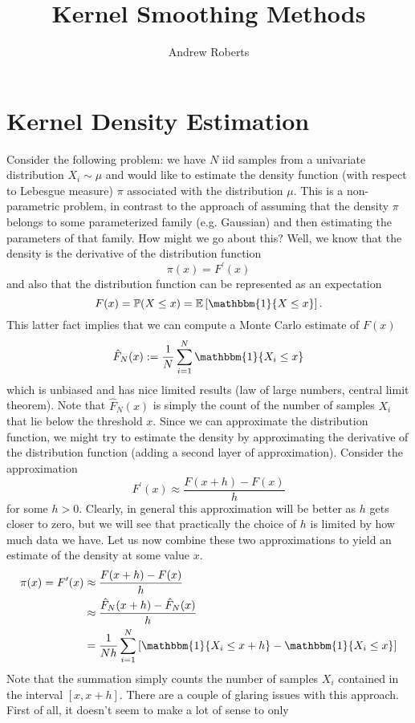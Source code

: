 \documentclass[12pt]{article}
\title{Kernel Smoothing Methods}
\author{Andrew Roberts}
\newcommand{\E}{\mathbb{E}}
\newcommand{\Prob}{\mathbb{P}}
\begin{document}
\maketitle
\tableofcontents
\newpage

\section{Kernel Density Estimation}
Consider the following problem: we have $N$ iid samples from a univariate distribution $X_i \sim \mu$ and would like to estimate the density function (with respect to Lebesgue measure) $\pi$ associated 
with the distribution $\mu$. This is a non-parametric problem, in contrast to the approach of assuming that the density $\pi$ belongs to some parameterized family (e.g. Gaussian) and then 
estimating the parameters of that family. How might we go about this? Well, we know that the density is the derivative of the distribution function
\[\pi(x) = F^\prime(x)\]
and also that the distribution function can be represented as an expectation 
\[F(x) = \Prob(X \leq x) = \E \left[\mathbbm{1}\{X \leq x\}\right].\]
This latter fact implies that we can compute a Monte Carlo estimate of $F(x)$
\[\hat{F}_N(x) := \frac{1}{N} \sum_{i = 1}^{N} \mathbbm{1}\{X_i \leq x\}\]
which is unbiased and has nice limited results (law of large numbers, central limit theorem). Note that $\hat{F}_N(x)$ is simply the count of the number of samples $X_i$ that lie below the threshold 
$x$. Since we can approximate the distribution function, we might try to estimate the density by approximating the derivative of the distribution function (adding a second layer of approximation). Consider the approximation 
\[F^\prime(x) \approx \frac{F(x + h) - F(x)}{h}\] 
for some $h > 0$. Clearly, in general this approximation will be better as $h$ gets closer to zero, but we will see that practically the choice of $h$ is limited by how much data we have. Let us now combine these two approximations 
to yield an estimate of the density at some value $x$.
\begin{align*}
\pi(x) = F^\prime(x) &\approx  \frac{F(x + h) - F(x)}{h} \\
			     &\approx \frac{\hat{F}_N(x + h) - \hat{F}_N(x)}{h} \\
			    &= \frac{1}{Nh} \sum_{i = 1}^{N} \left[\mathbbm{1}\{X_i \leq x + h\} - \mathbbm{1}\{X_i \leq x\} \right]
\end{align*}
Note that the summation simply counts the number of samples $X_i$ contained in the interval $[x, x + h]$. There are a couple of glaring issues with this approach. First of all, it doesn't seem to make a lot of sense to only 
\end{document}
